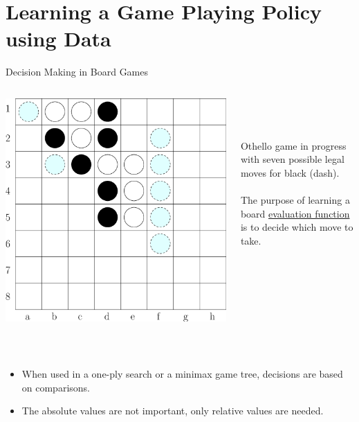 \documentclass[compress]{beamer}
\begin{document}
\section{Learning a Game Playing Policy using Data}



\begin{frame}{Decision Making in Board Games}
\begin{columns}[t]
\begin{column}{0.4\textwidth}
\begin{center}
\includegraphics[width=\textwidth,]{figs/othello_ipe.eps}
\end{center}
\end{column}
\begin{column}{0.6\textwidth}
\ \\ \ \\ \ \\
Othello game in progress with seven possible legal moves for black (dash). 
\\ \ \\
The purpose of learning a board \underline{evaluation function} is to decide which move to take. \pause
\end{column}
\end{columns}

\ \\
\begin{itemize}
\item When used in a one-ply search or a minimax game tree, decisions are based on comparisons. \pause
\item The absolute values are not important, only relative values are needed.
\end{itemize}


\end{frame}
\end{document}
